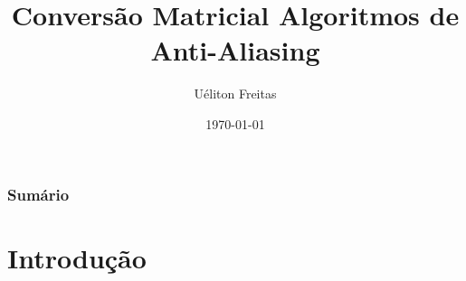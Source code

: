 \documentclass{beamer}
\title[Computação Gráfica]{Conversão Matricial Algoritmos de Anti-Aliasing} %
\author{Uéliton Freitas} %
\institute[UFMS] %
{
Universidade Católica Dom Bosco - UCDB \\ %
\medskip
\textit{freitas.ueliton@gmail.com} %
}
\date{\today} %
\begin{document}
\begin{frame}
\titlepage %
\end{frame}

\begin{frame}
\frametitle{Sumário} %
\tableofcontents %
\end{frame}





\section{Introdução} 

\end{document}
